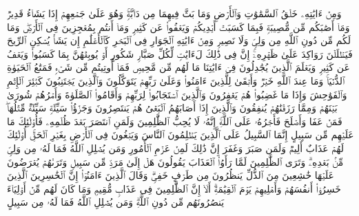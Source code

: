 \startbuffer[\q:42:29]
وَمِنۡ ءَایَٰتِهِۦ خَلۡقُ ٱلسَّمَٰوَٰتِ وَٱلۡأَرۡضِ وَمَا بَثَّ فِیهِمَا مِن دَاۤبَّةࣲۚ وَهُوَ عَلَىٰ جَمۡعِهِمۡ إِذَا یَشَاۤءُ قَدِیرࣱ%
\stopbuffer
\startbuffer[\q:42:30]
وَمَاۤ أَصَٰبَكُم مِّن مُّصِیبَةࣲ فَبِمَا كَسَبَتۡ أَیۡدِیكُمۡ وَیَعۡفُوا۟ عَن كَثِیرࣲ%
\stopbuffer
\startbuffer[\q:42:31]
وَمَاۤ أَنتُم بِمُعۡجِزِینَ فِی ٱلۡأَرۡضِۖ وَمَا لَكُم مِّن دُونِ ٱللَّهِ مِن وَلِیࣲّ وَلَا نَصِیرࣲ%
\stopbuffer
\startbuffer[\q:42:32]
وَمِنۡ ءَایَٰتِهِ ٱلۡجَوَارِ فِی ٱلۡبَحۡرِ كَٱلۡأَعۡلَٰمِ%
\stopbuffer
\startbuffer[\q:42:33]
إِن یَشَأۡ یُسۡكِنِ ٱلرِّیحَ فَیَظۡلَلۡنَ رَوَاكِدَ عَلَىٰ ظَهۡرِهِۦۤۚ إِنَّ فِی ذَٰلِكَ لَءَایَٰتࣲ لِّكُلِّ صَبَّارࣲ شَكُورٍ%
\stopbuffer
\startbuffer[\q:42:34]
أَوۡ یُوبِقۡهُنَّ بِمَا كَسَبُوا۟ وَیَعۡفُ عَن كَثِیرࣲ%
\stopbuffer
\startbuffer[\q:42:35]
وَیَعۡلَمَ ٱلَّذِینَ یُجَٰدِلُونَ فِیۤ ءَایَٰتِنَا مَا لَهُم مِّن مَّحِیصࣲ%
\stopbuffer
\startbuffer[\q:42:36]
فَمَاۤ أُوتِیتُم مِّن شَیۡءࣲ فَمَتَٰعُ ٱلۡحَیَوٰةِ ٱلدُّنۡیَاۚ وَمَا عِندَ ٱللَّهِ خَیۡرࣱ وَأَبۡقَىٰ لِلَّذِینَ ءَامَنُوا۟ وَعَلَىٰ رَبِّهِمۡ یَتَوَكَّلُونَ%
\stopbuffer
\startbuffer[\q:42:37]
وَٱلَّذِینَ یَجۡتَنِبُونَ كَبَٰۤئِرَ ٱلۡإِثۡمِ وَٱلۡفَوَٰحِشَ وَإِذَا مَا غَضِبُوا۟ هُمۡ یَغۡفِرُونَ%
\stopbuffer
\startbuffer[\q:42:38]
وَٱلَّذِینَ ٱسۡتَجَابُوا۟ لِرَبِّهِمۡ وَأَقَامُوا۟ ٱلصَّلَوٰةَ وَأَمۡرُهُمۡ شُورَىٰ بَیۡنَهُمۡ وَمِمَّا رَزَقۡنَٰهُمۡ یُنفِقُونَ%
\stopbuffer
\startbuffer[\q:42:39]
وَٱلَّذِینَ إِذَاۤ أَصَابَهُمُ ٱلۡبَغۡیُ هُمۡ یَنتَصِرُونَ%
\stopbuffer
\startbuffer[\q:42:40]
وَجَزَٰۤؤُا۟ سَیِّئَةࣲ سَیِّئَةࣱ مِّثۡلُهَاۖ فَمَنۡ عَفَا وَأَصۡلَحَ فَأَجۡرُهُۥ عَلَى ٱللَّهِۚ إِنَّهُۥ لَا یُحِبُّ ٱلظَّٰلِمِینَ%
\stopbuffer
\startbuffer[\q:42:41]
وَلَمَنِ ٱنتَصَرَ بَعۡدَ ظُلۡمِهِۦ فَأُو۟لَٰۤئِكَ مَا عَلَیۡهِم مِّن سَبِیلٍ%
\stopbuffer
\startbuffer[\q:42:42]
إِنَّمَا ٱلسَّبِیلُ عَلَى ٱلَّذِینَ یَظۡلِمُونَ ٱلنَّاسَ وَیَبۡغُونَ فِی ٱلۡأَرۡضِ بِغَیۡرِ ٱلۡحَقِّۚ أُو۟لَٰۤئِكَ لَهُمۡ عَذَابٌ أَلِیمࣱ%
\stopbuffer
\startbuffer[\q:42:43]
وَلَمَن صَبَرَ وَغَفَرَ إِنَّ ذَٰلِكَ لَمِنۡ عَزۡمِ ٱلۡأُمُورِ%
\stopbuffer
\startbuffer[\q:42:44]
وَمَن یُضۡلِلِ ٱللَّهُ فَمَا لَهُۥ مِن وَلِیࣲّ مِّنۢ بَعۡدِهِۦۗ وَتَرَى ٱلظَّٰلِمِینَ لَمَّا رَأَوُا۟ ٱلۡعَذَابَ یَقُولُونَ هَلۡ إِلَىٰ مَرَدࣲّ مِّن سَبِیلࣲ%
\stopbuffer
\startbuffer[\q:42:45]
وَتَرَىٰهُمۡ یُعۡرَضُونَ عَلَیۡهَا خَٰشِعِینَ مِنَ ٱلذُّلِّ یَنظُرُونَ مِن طَرۡفٍ خَفِیࣲّۗ وَقَالَ ٱلَّذِینَ ءَامَنُوۤا۟ إِنَّ ٱلۡخَٰسِرِینَ ٱلَّذِینَ خَسِرُوۤا۟ أَنفُسَهُمۡ وَأَهۡلِیهِمۡ یَوۡمَ ٱلۡقِیَٰمَةِۗ أَلَاۤ إِنَّ ٱلظَّٰلِمِینَ فِی عَذَابࣲ مُّقِیمࣲ%
\stopbuffer
\startbuffer[\q:42:46]
وَمَا كَانَ لَهُم مِّنۡ أَوۡلِیَاۤءَ یَنصُرُونَهُم مِّن دُونِ ٱللَّهِۗ وَمَن یُضۡلِلِ ٱللَّهُ فَمَا لَهُۥ مِن سَبِیلٍ%
